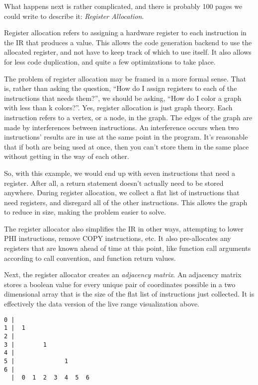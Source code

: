 \documentclass[
12pt,
letterpaper,
oneside,
]{memoir}
\begin{document}
\filbreak

What happens next is rather complicated, and there is probably 100 pages we could write to describe it: \emph{Register Allocation}.

Register allocation refers to assigning a hardware register to each instruction in the IR that produces a value. This allows the code generation backend to use the allocated register, and not have to keep track of which to use itself. It also allows for less code duplication, and quite a few optimizations to take place.

The problem of register allocation may be framed in a more formal sense. That is, rather than asking the question, ``How do I assign registers to each of the instructions that needs them?'', we should be asking, ``How do I color a graph with less than k colors?''. Yes, register allocation is just graph theory. Each instruction refers to a vertex, or a node, in the graph. The edges of the graph are made by interferences between instructions. An interference occurs when two instructions' results are in use at the same point in the program. It's reasonable that if both are being used at once, then you can't store them in the same place without getting in the way of each other.

So, with this example, we would end up with seven instructions that need a register. After all, a return statement doesn't actually need to be stored anywhere. During register allocation, we collect a flat list of instructions that need registers, and disregard all of the other instructions. This allows the graph to reduce in size, making the problem easier to solve.

\filbreak

The register allocator also simplifies the IR in other ways, attempting to lower PHI instructions, remove COPY instructions, etc. It also pre-allocates any registers that are known ahead of time at this point, like function call arguments according to call convention, and function return values.

Next, the register allocator creates an \emph{adjacency matrix}. An adjacency matrix stores a boolean value for every unique pair of coordinates possible in a two dimensional array that is the size of the flat list of instructions just collected. It is effectively the data version of the live range visualization above.

\begin{verbatim}
0 |
1 |  1
2 |
3 |        1
4 |
5 |              1
6 |
  |  0  1  2  3  4  5  6
\end{verbatim}
\end{document}
